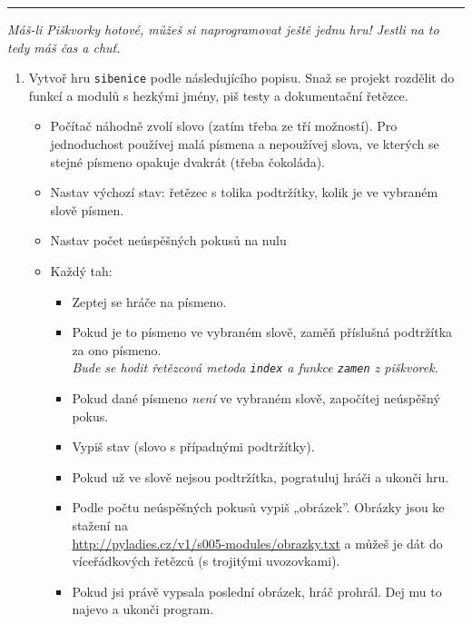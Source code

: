 \documentclass[a4paper,10pt]{article}
\newcommand\startsection[1]{
     \vspace{0.2ex}
    \hrule
    {\fontspec{Oxygen} \tiny
     \vspace{-1ex}
     \emph{#1}
     \vspace{-1.5em}
    }
}
\begin{document}
\newpage

\startsection{Máš-li Piškvorky hotové, můžeš si naprogramovat ještě jednu hru! Jestli na to tedy máš čas a chuť.}

\begin{enumerate}[resume]

\item Vytvoř hru \texttt{sibenice} podle následujícího popisu.
    Snaž se projekt rozdělit do funkcí a modulů s hezkými jmény,
    piš testy a dokumentační řetězce.

    \begin{itemize}
        \item Počítač náhodně zvolí slovo (zatím třeba ze tří možností).
            Pro jednoduchost používej malá písmena a nepoužívej slova,
            ve kterých se stejné písmeno opakuje dvakrát
            (třeba č\textcolor{plpink}{o}k\textcolor{plpink}{o}láda).
        \item Nastav výchozí stav: řetězec s tolika podtržítky, kolik je
             ve vybraném slově písmen.
        \item Nastav počet neúspěšných pokusů na nulu
        \item Každý tah:
            \begin{itemize}
                \item Zeptej se hráče na písmeno.
                \item Pokud je to písmeno ve vybraném slově, zaměň příslušná
                    podtržítka za ono písmeno.
                    \\\emph{\small Bude se hodit řetězcová metoda \texttt{index}
                    a funkce \texttt{zamen} z piškvorek.}
                \item Pokud dané písmeno \emph{není} ve vybraném slově,
                    započítej neúspěšný pokus.
                \item Vypiš stav (slovo s případnými podtržítky).
                \item Pokud už ve slově nejsou podtržítka, pogratuluj hráči
                    a ukonči hru.
                \item Podle počtu neúspěšných pokusů vypiš „obrázek”.
                    Obrázky jsou ke stažení na \\\url{http://pyladies.cz/v1/s005-modules/obrazky.txt}
                    a můžeš je dát do víceřádkových řetězců (s trojitými uvozovkami).
                \item Pokud jsi právě vypsala poslední obrázek, hráč prohrál.
                    Dej mu to najevo a ukonči program.
            \end{itemize}
    \end{itemize}


\end{enumerate}
\end{document}
